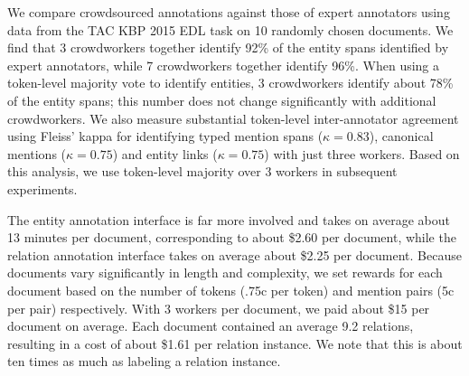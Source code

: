 We compare crowdsourced annotations against those of expert annotators using data from the TAC KBP 2015 EDL task on 10 randomly chosen documents.
We find that 3 crowdworkers together identify 92\% of the entity spans identified by expert annotators, while 7 crowdworkers together identify 96\%.
When using a token-level majority vote to identify entities, 3 crowdworkers identify about 78\% of the entity spans; this number does not change significantly with additional crowdworkers.
We also measure substantial token-level inter-annotator agreement using Fleiss' kappa for identifying typed mention spans ($\kappa = 0.83$), canonical mentions ($\kappa = 0.75$) and entity links ($\kappa = 0.75$) with just three workers.
Based on this analysis, we use token-level majority over 3 workers in subsequent experiments.

The entity annotation interface is far more involved and takes on average about 13 minutes per document, corresponding to about \$2.60 per document, while the relation annotation interface takes on average about \$2.25 per document.
Because documents vary significantly in length and complexity, we set rewards for each document based on the number of tokens (.75c per token) and mention pairs (5c per pair) respectively.
With 3 workers per document, we paid about \$15 per document on average.
Each document contained an average 9.2 relations, resulting in a cost of about \$1.61 per relation instance.
We note that this is about ten times as much as labeling a relation instance.

